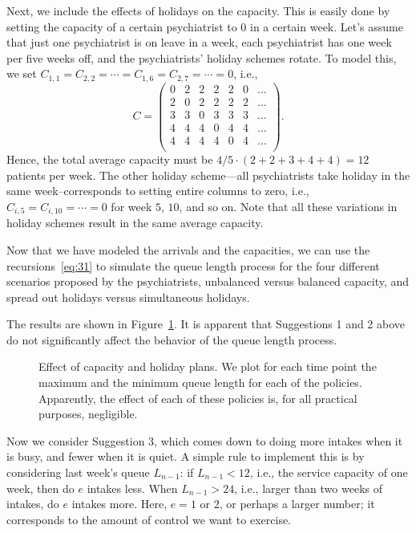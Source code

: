 Next, we include the effects of holidays on the capacity. This is
easily done by setting the capacity of a certain psychiatrist to 0 in
a certain week. Let's assume that just one psychiatrist is on leave in
a week, each psychiatrist has one week per five weeks off, and the
psychiatrists' holiday schemes rotate. To model this, we set
$C_{1,1}=C_{2,2}=\cdots=C_{1,6}=C_{2,7} =\cdots = 0$, i.e.,
\begin{equation*}
C = 
  \begin{pmatrix}
    0 & 2 & 2 & 2 & 2 & 0 & \ldots \\
    2 & 0 & 2 & 2 & 2 & 2 & \ldots\\
    3 & 3 & 0 & 3 & 3 & 3 & \ldots\\
    4 & 4 & 4 & 0 & 4 & 4 & \ldots\\
    4 & 4 & 4 & 4 & 0 & 4 & \ldots\\
  \end{pmatrix}.
\end{equation*}
Hence, the total average capacity must be $4/5 \cdot (2+2+3+4+4) = 12$
patients per week.  The other holiday scheme---all psychiatrists take
holiday in the same week--corresponds to setting entire columns to
zero, i.e., $C_{i,5}=C_{i,10}=\cdots=0$ for week $5$, $10$, and so
on. Note that all these variations in holiday schemes result in the
same average capacity.

Now that we have modeled the arrivals and the capacities, we can use the recursions~\eqref{eq:31} to simulate the queue length process for the four different scenarios proposed by the psychiatrists, unbalanced versus balanced capacity, and spread out holidays versus simultaneous holidays.

The results are shown in Figure~\ref{fig:balanced}.
It is apparent that Suggestions 1 and 2 above do not significantly affect the behavior of the queue length process.



\begin{figure}[ht]
  \centering
 
\caption{Effect of capacity and holiday plans. We plot for each time point
  the maximum and the minimum queue length for each of the
  policies. Apparently, the effect of each of these policies is, for
  all practical purposes, negligible.  }
\label{fig:balanced}
\end{figure}


Now we consider Suggestion 3, which comes down to doing more intakes when it is busy, and fewer when it is quiet.
A simple rule to implement this is by considering last week's queue $L_{n-1}$: if $L_{n-1}<12$, i.e., the service capacity of one week, then do $e$ intakes less.
When $L_{n-1}>24$, i.e., larger than two weeks of intakes, do $e$ intakes more.
Here, $e=1$ or $2$, or perhaps a larger number; it corresponds to the amount of control we want to exercise.

